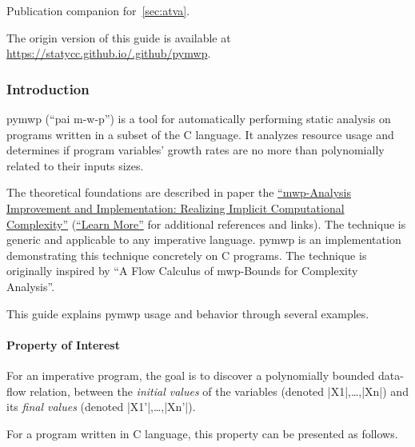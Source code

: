 Publication companion for~\autoref{sec:atva}.

The origin version of this guide is available at \url{https://statycc.github.io/.github/pymwp}.
\clearpage

\subsubsection{Introduction}\label{guide-introduction}

pymwp (\enquote{pai m-w-p}) is a tool for automatically performing static analysis on programs written in a subset of the C language.
It analyzes resource usage and determines if program variables' growth rates are no more than polynomially related to their inputs sizes.

The theoretical foundations are described in paper the \hyperref[sec:fscd]{\enquote{mwp-Analysis Improvement and Implementation: Realizing Implicit Computational Complexity}} (\cf \hyperref[guide-learn-more]{\enquote{Learn More}} for additional references and links).
The technique is generic and applicable to any imperative language.
pymwp is an implementation demonstrating this technique concretely on C programs.
The technique is originally inspired by \enquote{A Flow Calculus of mwp-Bounds for Complexity Analysis}.

This guide explains pymwp usage and behavior through several examples.

\paragraph*{Property of Interest}

For an imperative program, the goal is to discover a polynomially bounded data-flow relation, between the \emph{initial values} of the variables (denoted \pr|X1|,\ldots{},\pr|Xn|) and its \emph{final values} (denoted \pr|X1'|,\ldots{},\pr|Xn'|).

For a program written in C language, this property can be presented as follows.

\begin{minipage}{\textwidth}

\end{minipage}

